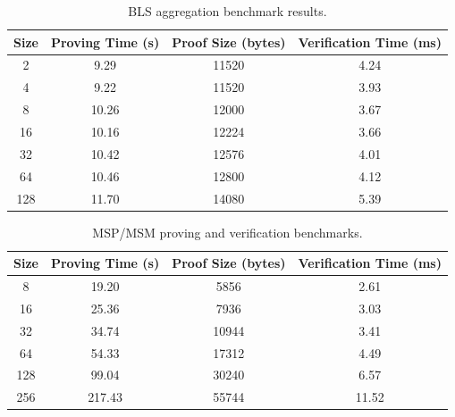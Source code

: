 \documentclass{article}
\begin{document}

\begin{table}[h]
\centering
\small
\begin{tabular}{cccc}
\toprule
\textbf{Size} & \textbf{Proving Time (s)} & \textbf{Proof Size (bytes)} & \textbf{Verification Time (ms)} \\
\midrule
2 & 9.29 & 11520 & 4.24 \\
4 & 9.22 & 11520 & 3.93 \\
8 & 10.26 & 12000 & 3.67 \\
16 & 10.16 & 12224 & 3.66 \\
32 & 10.42 & 12576 & 4.01 \\
64 & 10.46 & 12800 & 4.12 \\
128 & 11.70 & 14080 & 5.39 \\
\bottomrule
\end{tabular}
\caption{BLS aggregation benchmark results.}
\label{tab:bls-detailed}
\end{table}

\begin{table}[h]
\centering
\small
\begin{tabular}{cccc}
\toprule
\textbf{Size} & \textbf{Proving Time (s)} & \textbf{Proof Size (bytes)} & \textbf{Verification Time (ms)} \\
\midrule
8 & 19.20 & 5856 & 2.61 \\
16 & 25.36 & 7936 & 3.03 \\
32 & 34.74 & 10944 & 3.41 \\
64 & 54.33 & 17312 & 4.49 \\
128 & 99.04 & 30240 & 6.57 \\
256 & 217.43 & 55744 & 11.52 \\
\bottomrule
\end{tabular}
\caption{MSP/MSM proving and verification benchmarks.}
\label{tab:mspmsm-detailed}
\end{table}
\end{document}
